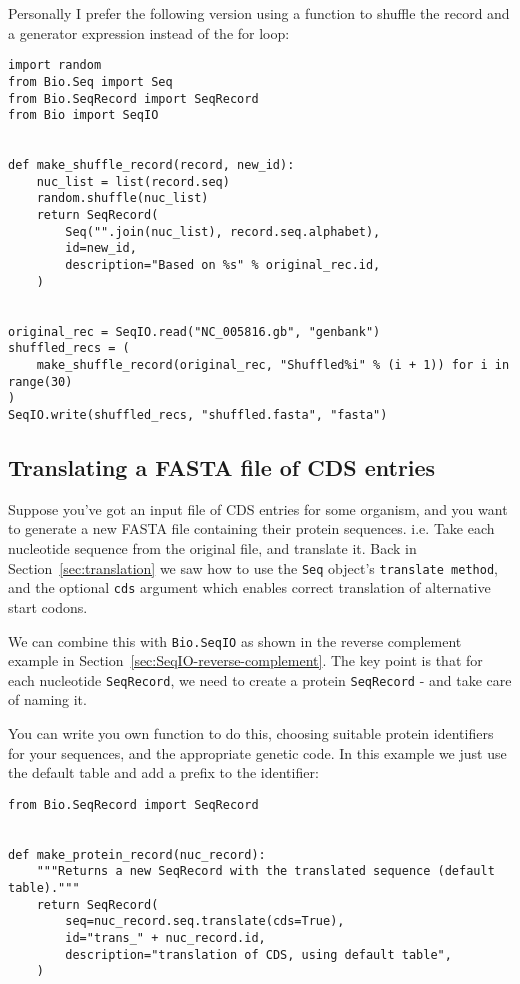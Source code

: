 Personally I prefer the following version using a function to shuffle the record
and a generator expression instead of the for loop:

\begin{verbatim}
import random
from Bio.Seq import Seq
from Bio.SeqRecord import SeqRecord
from Bio import SeqIO


def make_shuffle_record(record, new_id):
    nuc_list = list(record.seq)
    random.shuffle(nuc_list)
    return SeqRecord(
        Seq("".join(nuc_list), record.seq.alphabet),
        id=new_id,
        description="Based on %s" % original_rec.id,
    )


original_rec = SeqIO.read("NC_005816.gb", "genbank")
shuffled_recs = (
    make_shuffle_record(original_rec, "Shuffled%i" % (i + 1)) for i in range(30)
)
SeqIO.write(shuffled_recs, "shuffled.fasta", "fasta")
\end{verbatim}

\subsection{Translating a FASTA file of CDS entries}
\label{sec:SeqIO-translate}
Suppose you've got an input file of CDS entries for some organism, and you
want to generate a new FASTA file containing their protein sequences.  i.e.
Take each nucleotide sequence from the original file, and translate it.
Back in Section~\ref{sec:translation} we saw how to use the \verb|Seq|
object's \verb|translate method|, and the optional \verb|cds| argument
which enables correct translation of alternative start codons.

We can combine this with \verb|Bio.SeqIO| as
shown in the reverse complement example in Section~\ref{sec:SeqIO-reverse-complement}.
The key point is that for each nucleotide \verb|SeqRecord|, we need to create
a protein \verb|SeqRecord| - and take care of naming it.

You can write you own function to do this, choosing suitable protein identifiers
for your sequences, and the appropriate genetic code.  In this example we just
use the default table and add a prefix to the identifier:

\begin{verbatim}
from Bio.SeqRecord import SeqRecord


def make_protein_record(nuc_record):
    """Returns a new SeqRecord with the translated sequence (default table)."""
    return SeqRecord(
        seq=nuc_record.seq.translate(cds=True),
        id="trans_" + nuc_record.id,
        description="translation of CDS, using default table",
    )
\end{verbatim}

